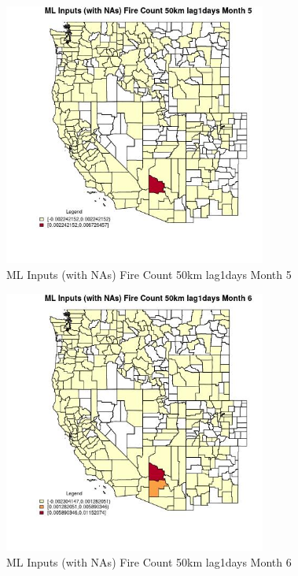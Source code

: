 \begin{figure} 
\centering  
\includegraphics[width=0.77\textwidth]{Code_Outputs/Report_ML_input_PM25_Step4_part_e_de_duplicated_aves_compiled_2019-05-21wNAs_CountyFire_Count_50km_lag1daysmedianMonth5.jpg} 
\caption{\label{fig:Report_ML_input_PM25_Step4_part_e_de_duplicated_aves_compiled_2019-05-21wNAsCountyFire_Count_50km_lag1daysmedianMonth5}ML Inputs (with NAs) Fire Count 50km lag1days Month 5} 
\end{figure} 
 

\begin{figure} 
\centering  
\includegraphics[width=0.77\textwidth]{Code_Outputs/Report_ML_input_PM25_Step4_part_e_de_duplicated_aves_compiled_2019-05-21wNAs_CountyFire_Count_50km_lag1daysmedianMonth6.jpg} 
\caption{\label{fig:Report_ML_input_PM25_Step4_part_e_de_duplicated_aves_compiled_2019-05-21wNAsCountyFire_Count_50km_lag1daysmedianMonth6}ML Inputs (with NAs) Fire Count 50km lag1days Month 6} 
\end{figure} 
 

